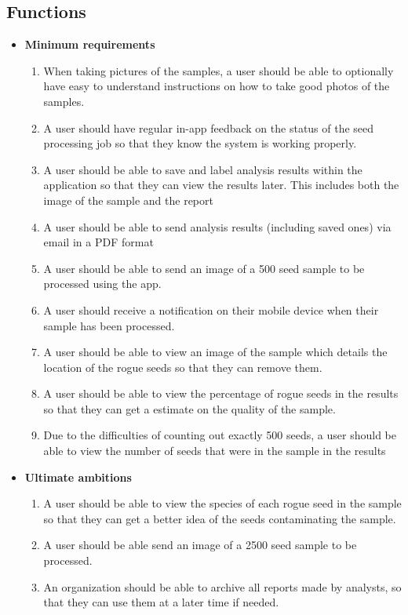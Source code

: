 \documentclass[onecolumn, draftclsnofoot,10pt, compsoc]{IEEEtran}
\begin{document}
\subsection{Functions}
\begin{itemize}
\item
\textbf{Minimum requirements}
\begin{enumerate}
\item
When taking pictures of the samples, a user should be able to optionally have easy to understand instructions on how to take good photos of the samples. 
\item
A user should have regular in-app feedback on the status of the seed processing job so that they know the system is working properly. 
\item
A user should be able to save and label analysis results within the application so that they can view the results later. This includes both the image of the sample and the report
\item
A user should be able to send analysis results (including saved ones) via email in a PDF format
\item
A user should be able to send an image of a 500 seed sample to be processed using the app. 
\item
A user should receive a notification on their mobile device when their sample has been processed. 
\item
A user should be able to view an image of the sample which details the location of the rogue seeds so that they can remove them.
\item
A user should be able to view the percentage of rogue seeds in the results so that they can get a estimate on the quality of the sample.
\item
Due to the difficulties of counting out exactly 500 seeds, a user should be able to view the number of seeds that were in the sample in the results
\end{enumerate}
\item
\textbf{Ultimate ambitions}
\begin{enumerate}
\item
A user should be able to view the species of each rogue seed in the sample so that they can get a better idea of the seeds contaminating the sample. 
\item
A user should be able send an image of a 2500 seed sample to be processed. 
\item
An organization should be able to archive all reports made by analysts, so that they can use them at a later time if needed. 
\end{enumerate}
\end{itemize}
\end{document}

